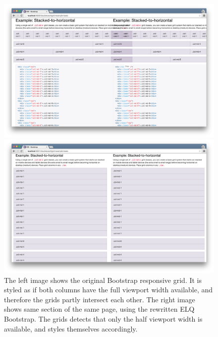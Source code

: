 \documentclass[a4paper,11pt]{kth-mag}
\begin{document}
      \begin{figure}[htbp]
        \centering
        \begin{minipage}{.5\textwidth}
          \centering
          \includegraphics[width=\linewidth]{images/bootstrap-mq-grid}
        \end{minipage}%
        \begin{minipage}{.5\textwidth}
          \centering
          \includegraphics[width=\linewidth]{images/bootstrap-eq-grid}
        \end{minipage}
        \caption{
          The left image shows the original Bootstrap responsive grid.
          It is styled as if both columns have the full viewport width available, and therefore the grids partly intersect each other.
          The right image shows same section of the same page, using the rewritten \gls{ELQ} Bootstrap.
          The grids detects that only the half viewport width is available, and styles themselves accordingly.
        }
        \label{fig:eval-bootstrap-mq-eq-grid}
      \end{figure}
\end{document}
